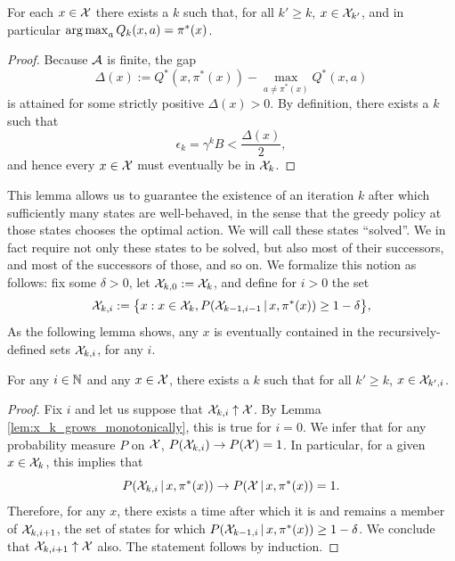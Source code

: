 \documentclass{article}
\def \cXk {\cX_k}
\begin{document}
\begin{lem}\label{lem:x_k_grows_monotonically}
For each $x \in \mathcal{X}$ there exists a $k$ such that, for all $k' \ge k$, $x \in \mathcal{X}_{k'}$, and in particular $\operatorname*{arg\,max}_a Q_k(x,a) = \pi^*(x)$.
\end{lem}
\begin{proof}
Because $\mathcal{A}$ is finite, the gap
\begin{equation*}
\Delta(x) := Q^*(x,\pi^*(x)) - \max_{a \ne \pi^*(x)} Q^*(x,a)
\end{equation*}
is attained for some strictly positive $\Delta(x) > 0$. By definition, there exists a $k$ such that
\begin{equation*}
\epsilon_k = \gamma^k B < \frac{\Delta(x)}{2},
\end{equation*}
and hence every $x \in \mathcal{X}$ must eventually be in $\mathcal{X}_k$.
\end{proof}
This lemma allows us to guarantee the existence of an iteration $k$ after which sufficiently many states are well-behaved, in the sense that the greedy policy at those states chooses the optimal action. We will call these states ``solved''. We in fact require not only these states to be solved, but also most of their successors, and most of the successors of those, and so on. We formalize this notion as follows: fix some $\delta > 0$, let $\mathcal{X}_{k,0} := \mathcal{X}_k$, and define for $i > 0$ the set
\begin{equation*}
\cX_{k,i} := \big \{ x : x \in \cXk, P(\cX_{k-1,i-1} \cbar x, \pi^*(x)) \ge 1 - \delta \big \},
\end{equation*}
As the following lemma shows, any $x$ is eventually contained in the recursively-defined sets $\mathcal{X}_{k,i}$, for any $i$.

\begin{lem}\label{lem:x_k_i_grows_monotonically}
For any $i \in \mathbb{N}$ and any $x \in \mathcal{X}$, there exists a $k$ such that for all $k' \ge k$, $x \in \mathcal{X}_{k',i}$.
\end{lem}
\begin{proof}
Fix $i$ and let us suppose that $\mathcal{X}_{k,i} \uparrow \mathcal{X}$. By Lemma \ref{lem:x_k_grows_monotonically}, this is true for $i=0$. We infer that for any probability measure $P$ on $\mathcal{X}$, $P(\mathcal{X}_{k,i}) \to P(\mathcal{X}) = 1$. In particular, for a given $x \in \mathcal{X}_k$, this implies that
\begin{equation*}
P(\mathcal{X}_{k, i} \, | \, x, \pi^*(x)) \to P(\mathcal{X} \, | \, x, \pi^*(x)) = 1.
\end{equation*}
Therefore, for any $x$, there exists a time after which it is and remains a member of $\mathcal{X}_{k,i+1}$, the set of states for which $P(\mathcal{X}_{k-1, i} \, | \, x, \pi^*(x)) \ge 1 - \delta$. We conclude that $\mathcal{X}_{k,i+1} \uparrow \mathcal{X}$ also. The statement follows by induction.
\end{proof}
\end{document}
